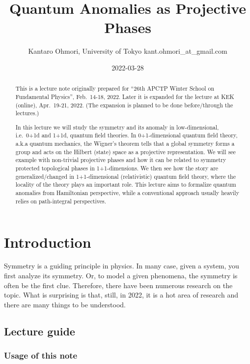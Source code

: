\documentclass[
]{scrartcl}
\title{Quantum Anomalies as Projective Phases}
\author{Kantaro Ohmori, University of Tokyo kant.ohmori\_at\_gmail.com}
\date{2022-03-28}
\numberwithin{equation}{section}
\theoremstyle{definition}
\theoremstyle{definition}
\theoremstyle{definition}
\theoremstyle{definition}
\theoremstyle{remark}
\begin{document}
\maketitle
\begin{abstract}
This is a lecture note originally prepared for ``26th APCTP Winter School on Fundamental Physics'', Feb.~14-18, 2022.
Later it is expanded for the lecture at KEK (online), Apr.~19-21, 2022.
(The expansion is planned to be done before/through the lectures.)

In this lecture we will study the symmetry and its anomaly in low-dimensional, i.e.~0+1d and 1+1d, quantum field theories.
In 0+1-dimensional quantum field theory, a.k.a quantum mechanics, the Wigner's theorem tells that a global symmetry forms a group and acts on the Hilbert (state) space as a projective representation. We will see example with non-trivial projective phases and how it can be related to symmetry protected topological phases in 1+1-dimensions. We then see how the story are generalized/changed in 1+1-dimensional (relativistic) quantum field theory, where the locality of the theory plays an important role.
This lecture aims to formalize quantum anomalies from Hamiltonian perspective, while a conventional approach usually heavily relies on path-integral perspectives.
\end{abstract}

{
\setcounter{tocdepth}{2}
\tableofcontents
}
\hypertarget{introduction}{%
\section{Introduction}\label{introduction}}

Symmetry is a guiding principle in physics. In many case, given a system, you first analyze its symmetry. Or, to model a given phenomena, the symmetry is often be the first clue.
Therefore, there have been numerous research on the topic. What is surprising is that, still, in 2022, it is a hot area of research and there are many things to be understood.

\hypertarget{lecture-guide}{%
\subsection{Lecture guide}\label{lecture-guide}}

\hypertarget{usage-of-this-note}{%
\subsubsection{Usage of this note}\label{usage-of-this-note}}
\end{document}
